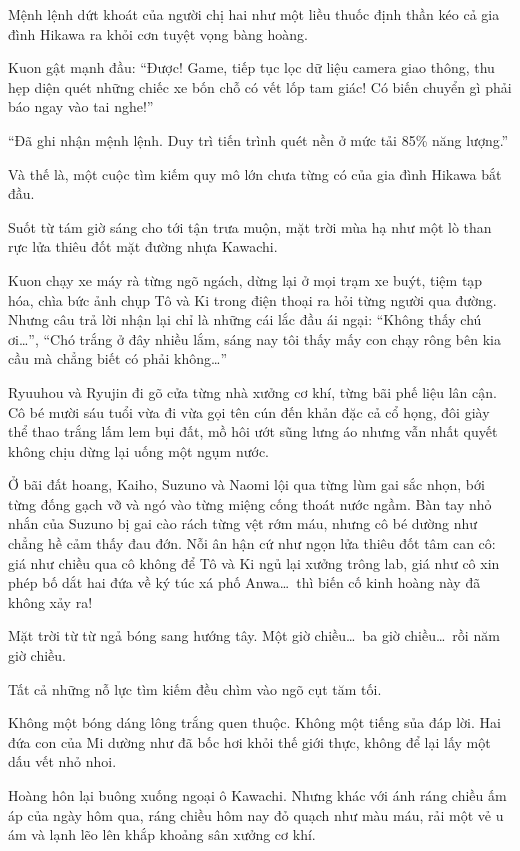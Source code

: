 \documentclass[../main.tex]{subfiles}
\begin{document}
Mệnh lệnh dứt khoát của người chị hai như một liều thuốc định thần kéo cả gia đình Hikawa ra khỏi cơn tuyệt vọng bàng hoàng.

Kuon gật mạnh đầu: ``Được! Game, tiếp tục lọc dữ liệu camera giao thông, thu hẹp diện quét những chiếc xe bốn chỗ có vết lốp tam giác! Có biến chuyển gì phải báo ngay vào tai nghe!''

``Đã ghi nhận mệnh lệnh. Duy trì tiến trình quét nền ở mức tải 85\% năng lượng.''

Và thế là, một cuộc tìm kiếm quy mô lớn chưa từng có của gia đình Hikawa bắt đầu.

\ct

Suốt từ tám giờ sáng cho tới tận trưa muộn, mặt trời mùa hạ như một lò than rực lửa thiêu đốt mặt đường nhựa Kawachi.

Kuon chạy xe máy rà từng ngõ ngách, dừng lại ở mọi trạm xe buýt, tiệm tạp hóa, chìa bức ảnh chụp Tô và Ki trong điện thoại ra hỏi từng người qua đường. Nhưng câu trả lời nhận lại chỉ là những cái lắc đầu ái ngại: ``Không thấy chú ơi\dots'', ``Chó trắng ở đây nhiều lắm, sáng nay tôi thấy mấy con chạy rông bên kia cầu mà chẳng biết có phải không\dots''

Ryuuhou và Ryujin đi gõ cửa từng nhà xưởng cơ khí, từng bãi phế liệu lân cận. Cô bé mười sáu tuổi vừa đi vừa gọi tên cún đến khản đặc cả cổ họng, đôi giày thể thao trắng lấm lem bụi đất, mồ hôi ướt sũng lưng áo nhưng vẫn nhất quyết không chịu dừng lại uống một ngụm nước.

Ở bãi đất hoang, Kaiho, Suzuno và Naomi lội qua từng lùm gai sắc nhọn, bới từng đống gạch vỡ và ngó vào từng miệng cống thoát nước ngầm. Bàn tay nhỏ nhắn của Suzuno bị gai cào rách từng vệt rớm máu, nhưng cô bé dường như chẳng hề cảm thấy đau đớn. Nỗi ân hận cứ như ngọn lửa thiêu đốt tâm can cô: giá như chiều qua cô không để Tô và Ki ngủ lại xưởng trông lab, giá như cô xin phép bố dắt hai đứa về ký túc xá phố Anwa\dots\ thì biến cố kinh hoàng này đã không xảy ra!

Mặt trời từ từ ngả bóng sang hướng tây. Một giờ chiều\dots\ ba giờ chiều\dots\ rồi năm giờ chiều.

Tất cả những nỗ lực tìm kiếm đều chìm vào ngõ cụt tăm tối.

Không một bóng dáng lông trắng quen thuộc. Không một tiếng sủa đáp lời. Hai đứa con của Mi dường như đã bốc hơi khỏi thế giới thực, không để lại lấy một dấu vết nhỏ nhoi.

\ct

Hoàng hôn lại buông xuống ngoại ô Kawachi. Nhưng khác với ánh ráng chiều ấm áp của ngày hôm qua, ráng chiều hôm nay đỏ quạch như màu máu, rải một vẻ u ám và lạnh lẽo lên khắp khoảng sân xưởng cơ khí.
\end{document}
